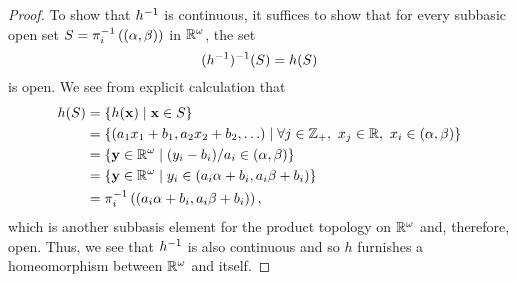 \begin{solution}
\begin{proof}
        To show that $h^{-1}$ is continuous, it suffices to show that for every subbasic open set $S = \pi_i^{-1}\left((\alpha, \beta)\right)$ in $\mathbb{R}^\omega$, the set
        \begin{equation*}
            (h^{-1})^{-1}(S) = h(S)
        \end{equation*}
        is open.
        We see from explicit calculation that
        \begin{align*}
            h(S)    &= \{h(\mathbf{x}) \mid \mathbf{x} \in S\} \\
                    &= \{(a_1 x_1 + b_1, a_2 x_2 + b_2, \ldots) \mid \forall j \in \mathbb{Z}_+,~ x_j \in \mathbb{R},~ x_i \in (\alpha, \beta)\} \\
                    &= \{\mathbf{y} \in \mathbb{R}^\omega \mid  (y_i - b_i) / a_i \in (\alpha, \beta)\} \\
                    &= \{\mathbf{y} \in \mathbb{R}^\omega \mid y_i \in \left(a_i \alpha + b_i, a_i \beta + b_i\right)\} \\
                    &= \pi_i^{-1}\left((a_i \alpha + b_i, a_i \beta + b_i)\right),
        \end{align*}
        which is another subbasis element for the product topology on $\mathbb{R}^\omega$ and, therefore, open.
        Thus, we see that $h^{-1}$ is also continuous and so $h$ furnishes a homeomorphism between $\mathbb{R}^\omega$ and itself.
    \end{proof}
\end{solution}
\newpage


